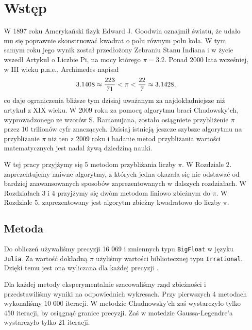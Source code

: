 \documentclass[11pt, wide, leqno]{mwart}
\begin{document}
\maketitle
\tableofcontents

\section{Wstęp}\label{sec:ws}

W 1897 roku Amerykański fizyk Edward J. Goodwin oznajmił światu, że udało mu się poprawnie skonstruować kwadrat o polu równym polu koła. W tym samym roku jego wynik został przedłożony Zebraniu Stanu Indiana i w życie wszedł Artykuł o Liczbie Pi, na mocy którego $\pi=3.2$. Ponad 2000 lata wcześniej, w III wieku p.n.e., Archimedes napisał
$$3.1408\approx{223\over71}<\pi<{22\over7}\approx 3.1428,$$
co daje ograniczenia bliższe tym dzisiaj uważanym za najdokładniejsze niż artykuł z XIX wieku. W 2009 roku za pomocą algorytmu braci Chudowsky'ch, wyprowadzonego ze wzorów S. Ramanujana, zostało osiągniete przybliżenie $\pi$ przez 10 trilionów cyfr znaczących. Dzisiaj istnieją jeszcze szybsze algorytmu na przybliżanie $\pi$ niż ten z 2009 roku i badanie metod przybliżania wartości matematycznych jest nadal żywą dziedziną nauki.

W tej pracy przyjżymy się 5 metodom przybliżania liczby $\pi$. W Rozdziale 2. zaprezentujemy naiwne algorytmy, z których jedna okazała się nie odstawać od bardziej zaawansowanych sposobów zaprezentowanych w dalszych rozdziałach. W Rozdziałach 3 i 4 przyjżymy się dwóm metodom liniowo zbieżnym do $\pi$. W Rozdziale 5. zaprezentowany jest algorytm zbieżny kwadratowo do liczby $\pi$.

\subsection{Metoda}

Do obliczeń używaliśmy precyzji 16 069 i zmiennych typu \verb+BigFloat+ w języku \verb+Julia+. Za wartość dokładną $\pi$ użyliśmy wartości bibliotecznej typu \verb+Irrational+. Dzięki temu jest ona wyliczana dla każdej precyzji \cite{julia}.

Dla każdej metody eksperymentalnie szacowaliśmy rząd zbieżności i przedstawiliśmy wyniki na odpowiednich wykresach. Przy pierwszych 4 metodach wykonaliśmy 10 000 iteracji. W metodzie Chudnowsky'ch zaś wystarczyło tylko 450 iteracji, by osiągnąć granice precyzji. Zaś w motedzie Gaussa-Legendre'a wystarczyło tylko 21 iteracji. 
\end{document}
